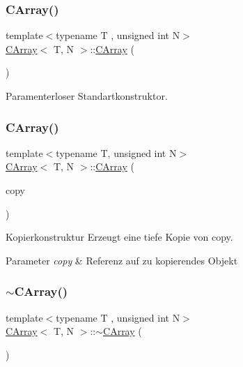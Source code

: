 \subsubsection{\texorpdfstring{C\+Array()}{CArray()}\hspace{0.1cm}{\footnotesize\ttfamily [1/2]}}
{\footnotesize\ttfamily template$<$typename T , unsigned int N$>$ \\
\hyperlink{class_c_array}{C\+Array}$<$ T, N $>$\+::\hyperlink{class_c_array}{C\+Array} (\begin{DoxyParamCaption}{ }\end{DoxyParamCaption})}



Paramenterloser Standartkonstruktor. 

\mbox{\label{class_c_array_add790ca71782225282e735fabaa36626}} 
\subsubsection{\texorpdfstring{C\+Array()}{CArray()}\hspace{0.1cm}{\footnotesize\ttfamily [2/2]}}
{\footnotesize\ttfamily template$<$typename T, unsigned int N$>$ \\
\hyperlink{class_c_array}{C\+Array}$<$ T, N $>$\+::\hyperlink{class_c_array}{C\+Array} (\begin{DoxyParamCaption}\item[{const \hyperlink{class_c_array}{C\+Array}$<$ T, N $>$ \&}]{copy }\end{DoxyParamCaption})}



Kopierkonstruktur Erzeugt eine tiefe Kopie von copy. 


\begin{DoxyParams}{Parameter}
{\em copy} & Referenz auf zu kopierendes Objekt \\
\hline
\end{DoxyParams}
\mbox{\label{class_c_array_a1aa64db8be620da54c5987f16544a206}} 
\subsubsection{\texorpdfstring{$\sim$\+C\+Array()}{~CArray()}}
{\footnotesize\ttfamily template$<$typename T , unsigned int N$>$ \\
\hyperlink{class_c_array}{C\+Array}$<$ T, N $>$\+::$\sim$\hyperlink{class_c_array}{C\+Array} (\begin{DoxyParamCaption}{ }\end{DoxyParamCaption})\hspace{0.3cm}{\ttfamily [virtual]}}



